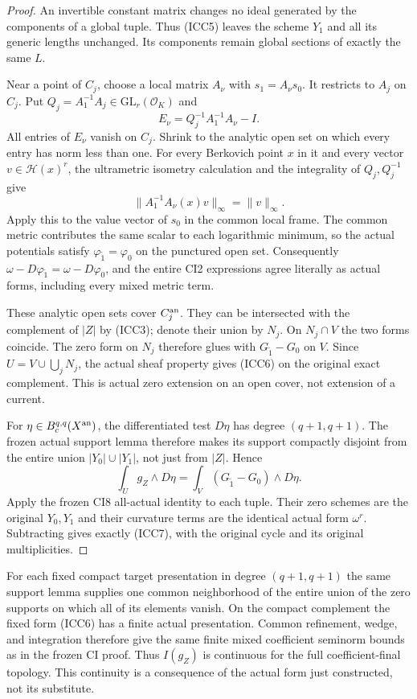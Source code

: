 \begin{proof}
An invertible constant matrix changes no ideal generated by
the components of a global tuple.  Thus (ICC5) leaves the
scheme $Y_1$ and all its generic lengths unchanged.  Its
components remain global sections of exactly the same $L$.

Near a point of $C_j$, choose a local matrix $A_\nu$ with
$s_1=A_\nu s_0$.  It restricts to $A_j$ on $C_j$.  Put
$Q_j=A_1^{-1}A_j\in\mathrm{GL}_r(\mathcal O_K)$ and
\[
            E_\nu=Q_j^{-1}A_1^{-1}A_\nu-I.
 \tag{ICC8}
\]
All entries of $E_\nu$ vanish on $C_j$.  Shrink to the
analytic open set on which every entry has norm less than
one.  For every Berkovich point $x$ in it and every vector
$v\in\mathscr H(x)^r$, the ultrametric isometry calculation
and the integrality of $Q_j,Q_j^{-1}$ give
\[
                 \|A_1^{-1}A_\nu(x)v\|_\infty
                                      =\|v\|_\infty.
 \tag{ICC9}
\]
Apply this to the value vector of $s_0$ in the common local
frame.  The common metric contributes the same scalar to
each logarithmic minimum, so the actual potentials satisfy
$\varphi_{\widetilde1}=\varphi_0$ on the punctured open set.
Consequently $\omega-D\varphi_{\widetilde1}
=\omega-D\varphi_0$, and the entire CI2 expressions agree
literally as actual forms, including every mixed metric term.

These analytic open sets cover $C_j^{\rm an}$.  They can be
intersected with the complement of $|Z|$ by (ICC3); denote
their union by $N_j$.  On $N_j\cap V$ the two forms coincide.
The zero form on $N_j$ therefore glues with
$G_{\widetilde1}-G_0$ on $V$.  Since
$U=V\cup\bigcup_jN_j$, the actual sheaf property gives
(ICC6) on the original exact complement.  This is actual
zero extension on an open cover, not extension of a current.

For $\eta\in B_c^{q,q}(X^{\rm an})$, the differentiated test
$D\eta$ has degree $(q+1,q+1)$.  The frozen actual support
lemma therefore makes its support compactly disjoint from
the entire union $|Y_0|\cup|Y_1|$, not just from $|Z|$.
Hence
\[
 \int_Ug_Z\wedge D\eta
     =\int_V(G_{\widetilde1}-G_0)\wedge D\eta.
 \tag{ICC10}
\]
Apply the frozen CI8 all-actual identity to each tuple.
Their zero schemes are the original $Y_0,Y_1$ and their
curvature terms are the identical actual form $\omega^r$.
Subtracting gives exactly (ICC7), with the original cycle
and its original multiplicities.
\end{proof}

For each fixed compact target presentation in degree
$(q+1,q+1)$ the same support lemma supplies one common
neighborhood of the entire union of the zero supports on
which all of its elements vanish.  On the compact complement
the fixed form (ICC6) has a finite actual presentation.
Common refinement, wedge, and integration therefore give
the same finite mixed coefficient seminorm bounds as in the
frozen CI proof.  Thus $I(g_Z)$ is continuous for the full
coefficient-final topology.  This continuity is a consequence
of the actual form just constructed, not its substitute.

